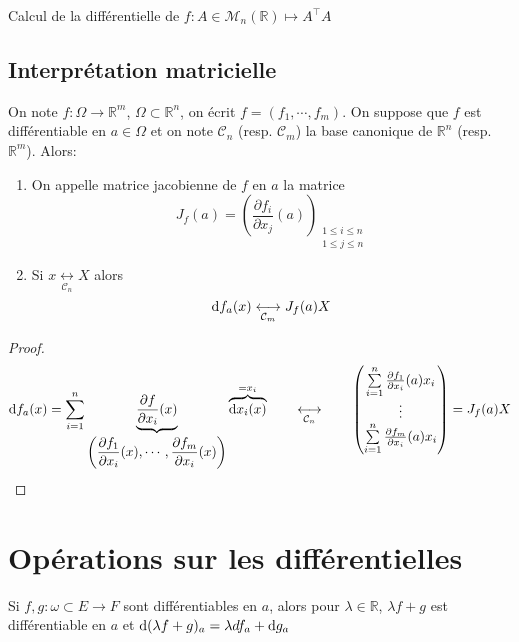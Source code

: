 \begin{exo} Calcul de la différentielle de
{$f:A\in\mathcal M_n(\mathbb R)\longmapsto A^\intercal A$}
\end{exo}

\subsection{Interprétation matricielle}

\begin{thmdef}
On note $f:\Omega\to \mathbb R^m$, $\Omega\subset \mathbb R^n$, on écrit $f=(f_1, \cdots, f_m)$. On suppose que $f$ est différentiable en $a\in\Omega$ et on note $\mathcal C_n$ (resp. $\mathcal C_m$) la base canonique de $\mathbb R^n$ (resp. $\mathbb R^m$). Alors: \begin{enumerate}
    \item On appelle matrice jacobienne de $f$ en $a$ la matrice \[
        J_f(a)=\left(\frac{\partial f_i}{\partial x_j}(a)\right)_{\substack{1\leq i\leq n\\ 1\leq j\leq n}}
    \]
    \item Si $x\underset{\mathcal C_n}{\longleftrightarrow}X$ alors \[
        \mathrm{d} f_a(x)\underset{\mathcal C_m}\longleftrightarrow J_f(a)X
    \]
\end{enumerate}
\end{thmdef}

\begin{proof}
\[
    \mathrm{d} f_a(x)=\sum_{i=1}^n\underbrace{\frac{\partial f}{\partial x_i}(x)}_{\displaystyle \left(\frac{\partial f_1}{\partial x_i}(x), \cdots, \frac{\partial f_m}{\partial x_i}(x)\right)}\overbrace{\mathrm{d} x_i(x)}^{=x_i} \qquad \underset{\mathcal C_n}{\longleftrightarrow}\qquad \begin{pmatrix}
    \sum_{i=1}^n\limits \frac{\partial f_1}{\partial x_i}(a)x_i \\
    \vdots \\
    \sum_{i=1}^n\limits \frac{\partial f_m}{\partial x_i}(a)x_i 
    \end{pmatrix}=J_f(a)X
\]
\end{proof}

\section{Opérations sur les différentielles}

\begin{prop}
Si $f,g:\omega\subset E\to F$ sont différentiables en $a$, alors pour $\lambda\in\mathbb R$, $\lambda f+g$ est différentiable en $a$ et $\mathrm{d} (\lambda f+g)_a=\lambda df_a+\mathrm{d} g_a$
\end{prop}

